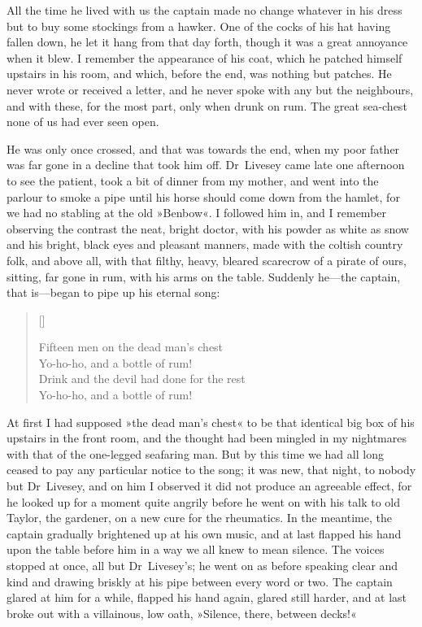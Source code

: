 All the time he lived with us the captain made no change what\-ever in his dress but to buy some stockings from a hawker. One of the cocks of his hat having fallen down, he let it hang from that day forth, though it was a great annoyance when it blew. I remember the appearance of his coat, which he patched himself upstairs in his room, and which, before the end, was nothing but patches. He never wrote or received a letter, and he never spoke with any but the neighbours, and with these, for the most part, only when drunk on rum. The great sea-chest none of us had ever seen open.

He was only once crossed, and that was towards the end, when my poor father was far gone in a decline that took him off. Dr~Livesey came late one afternoon to see the patient, took a bit of dinner from my mother, and went into the parlour to smoke a pipe until his horse should come down from the hamlet, for we had no stabling at the old »Benbow«. I followed him in, and I remember observing the contrast the neat, bright doctor, with his powder as white as snow and his bright, black eyes and pleasant manners, made with the coltish country folk, and above all, with that filthy, heavy, bleared scarecrow of a pirate of ours, sitting, far gone in rum, with his arms on the table. Suddenly he---the captain, that is---began to pipe up his eternal song:

\settowidth{\versewidth}{Drink and the devil had done for the rest\longdash}
\begin{verse}[\versewidth]
\begin{altverse}
Fifteen men on the dead man’s chest\longdash\\
Yo-ho-ho, and a bottle of rum!\\
Drink and the devil had done for the rest\longdash\\
Yo-ho-ho, and a bottle of rum!
\end{altverse}
\end{verse}

At first I had supposed »the dead man's chest« to be that identical big box of his upstairs in the front room, and the thought had been mingled in my nightmares with that of the one-legged seafaring man. But by this time we had all long ceased to pay any particular notice to the song; it was new, that night, to nobody but Dr~Livesey, and on him I observed it did not produce an agreeable effect, for he looked up for a moment quite angrily before he went on with his talk to old Taylor, the gardener, on a new cure for the rheumatics. In the meantime, the captain gradually brightened up at his own music, and at last flapped his hand upon the table before him in a way we all knew to mean silence. The voices stopped at once, all but Dr~Livesey's; he went on as before speaking clear and kind and drawing briskly at his pipe between every word or two. The captain glared at him for a while, flapped his hand again, glared still harder, and at last broke out with a villainous, low oath, »Silence, there, between decks!«


